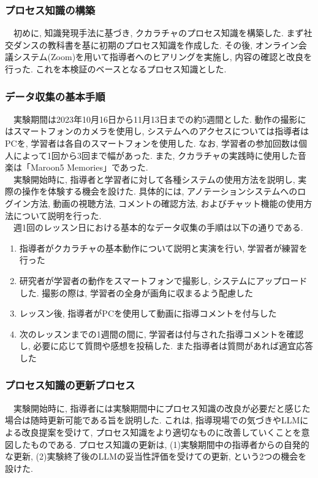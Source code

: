\subsubsection{プロセス知識の構築}
　初めに, 知識発現手法に基づき, クカラチャのプロセス知識を構築した. まず社交ダンスの教科書を基に初期のプロセス知識を作成した. その後, オンライン会議システム(Zoom)を用いて指導者へのヒアリングを実施し, 内容の確認と改良を行った. これを本検証のベースとなるプロセス知識とした.\\


\subsubsection{データ収集の基本手順}
　実験期間は2023年10月16日から11月13日までの約5週間とした. 動作の撮影にはスマートフォンのカメラを使用し, システムへのアクセスについては指導者はPCを, 学習者は各自のスマートフォンを使用した. なお, 学習者の参加回数は個人によって1回から3回まで幅があった. また, クカラチャの実践時に使用した音楽は「Maroon5 Memories」であった.\\
　実験開始時に, 指導者と学習者に対して各種システムの使用方法を説明し, 実際の操作を体験する機会を設けた. 具体的には, アノテーションシステムへのログイン方法, 動画の視聴方法, コメントの確認方法, およびチャット機能の使用方法について説明を行った.\\
　週1回のレッスン日における基本的なデータ収集の手順は以下の通りである.\\
\begin{enumerate}
    \item 指導者がクカラチャの基本動作について説明と実演を行い, 学習者が練習を行った
    \item 研究者が学習者の動作をスマートフォンで撮影し, システムにアップロードした. 撮影の際は, 学習者の全身が画角に収まるよう配慮した
    \item レッスン後, 指導者がPCを使用して動画に指導コメントを付与した
    \item 次のレッスンまでの1週間の間に, 学習者は付与された指導コメントを確認し, 必要に応じて質問や感想を投稿した. また指導者は質問があれば適宜応答した
\end{enumerate}

\subsubsection{プロセス知識の更新プロセス}
　実験開始時に, 指導者には実験期間中にプロセス知識の改良が必要だと感じた場合は随時更新可能である旨を説明した. これは, 指導現場での気づきやLLMによる改良提案を受けて, プロセス知識をより適切なものに改善していくことを意図したものである. プロセス知識の更新は, (1)実験期間中の指導者からの自発的な更新, (2)実験終了後のLLMの妥当性評価を受けての更新, という2つの機会を設けた.\\

